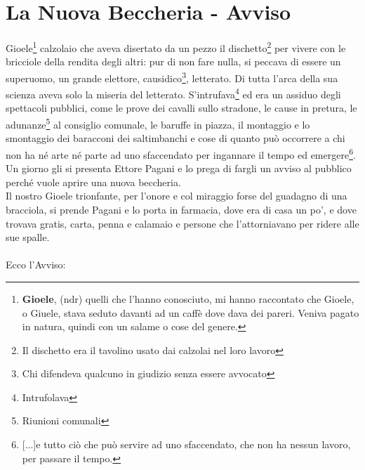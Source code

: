 
\chapter{La Nuova Beccheria - Avviso}
Gioele\footnote{\textbf{Gioele}, (ndr) quelli che l'hanno conosciuto, mi hanno raccontato che Gioele, o Giuele, stava seduto davanti ad un caffè dove dava dei pareri. Veniva pagato in natura, quindi con un salame o cose del genere.} calzolaio che aveva disertato da un pezzo il dischetto\footnote{Il dischetto era il tavolino usato dai calzolai nel loro lavoro} per vivere con le bricciole della rendita degli altri: pur di non fare nulla, si peccava di essere un superuomo, un grande elettore, causidico\footnote{Chi difendeva qualcuno in giudizio senza essere avvocato}, letterato. Di tutta l'arca della sua scienza aveva solo la miseria del letterato. S'intrufava\footnote{Intrufolava} ed era un assiduo degli spettacoli pubblici, come le prove dei cavalli sullo stradone, le cause in pretura, le adunanze\footnote{Riunioni comunali} al consiglio comunale, le baruffe in piazza, il montaggio e lo smontaggio dei baracconi dei saltimbanchi e cose di quanto può occorrere a chi non ha né arte né parte ad uno sfaccendato per ingannare il tempo ed emergere\footnote{[...]e tutto ciò che può servire ad uno sfaccendato, che non ha nessun lavoro, per passare il tempo.}.\\
\indent Un giorno gli si presenta Ettore Pagani e lo prega di fargli un avviso al pubblico perché vuole aprire una nuova beccheria. \\
\indent Il nostro Gioele trionfante, per l'onore e col miraggio forse del guadagno di una bracciola, si prende Pagani e lo porta in farmacia, dove era di casa un po', e dove trovava gratis, carta, penna e calamaio e persone che l'attorniavano per ridere alle sue spalle.\\
\\
\indent Ecco l'Avviso:

 \normalsize \normalfont 

